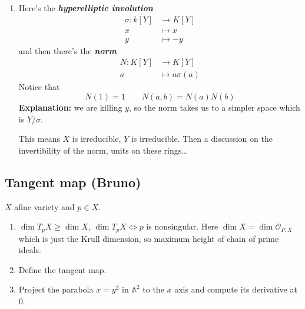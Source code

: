 \begin{enumerate}[label=\textbf{Step \arabic*}]
	\item Here's the \textit{\textbf{hyperelliptic involution}}
		\begin{align*}
			\sigma: k[Y] &\longrightarrow K[Y] \\
		x &\longmapsto x\\
		y&\longmapsto-y
	\end{align*}
	and then there's the \textit{\textbf{norm}}
	\begin{align*}
		N: K[Y] &\longrightarrow K[Y] \\
		a&\longmapsto a\sigma(a)
	\end{align*}
	Notice that
	\[N(1)=1\qquad N(a,b)=N(a)N(b)\]
	\textbf{Explanation:} we are killing $y$, so the norm takes us to a simpler space which is $Y/\sigma$.

This means $X$ is irreducible, $Y$ is irreducible. Then a discussion on the invertibility of the norm, units on these rings…
\end{enumerate}

 \subsection{Tangent map (Bruno)}

\begin{manualexercise}{5.10}
$X$ afine variety and $p\in X$.
\begin{enumerate}[label=\alph*.]
	\item $\dim T_pX\geq \dim X$, $\dim T_pX\iff p$ is nonsingular. Here $\dim X=\dim \mathcal{O}_{P,X}$ which is just the Krull dimension, so maximum height of chain of prime ideals.
	\item Define the tangent map.

	\item Project the parabola $x=y^2$ in $\mathbb{A}^2$ to the  $x$ axis and compute its derivative at 0.
		\end{enumerate}
\end{manualexercise}

